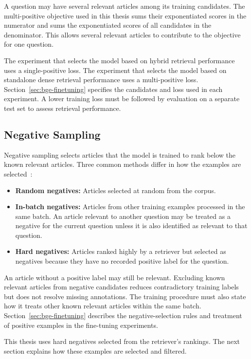 A question may have several relevant articles among its training candidates. The multi-positive objective used in this thesis sums their exponentiated scores in the numerator and sums the exponentiated scores of all candidates in the denominator. This allows several relevant articles to contribute to the objective for one question.

The experiment that selects the model based on hybrid retrieval performance uses a single-positive loss. The experiment that selects the model based on standalone dense retrieval performance uses a multi-positive loss. Section~\ref{sec:bge-finetuning} specifies the candidates and loss used in each experiment. A lower training loss must be followed by evaluation on a separate test set to assess retrieval performance.

\subsection{Negative Sampling}

Negative sampling selects articles that the model is trained to rank below the known relevant articles. Three common methods differ in how the examples are selected~\cite{karpukhin2020,zhan2021}:
\begin{itemize}
    \item \textbf{Random negatives:} Articles selected at random from the corpus.
    \item \textbf{In-batch negatives:} Articles from other training examples processed in the same batch. An article relevant to another question may be treated as a negative for the current question unless it is also identified as relevant to that question.
    \item \textbf{Hard negatives:} Articles ranked highly by a retriever but selected as negatives because they have no recorded positive label for the question.
\end{itemize}

An article without a positive label may still be relevant. Excluding known relevant articles from negative candidates reduces contradictory training labels but does not resolve missing annotations. The training procedure must also state how it treats other known relevant articles within the same batch. Section~\ref{sec:bge-finetuning} describes the negative-selection rules and treatment of positive examples in the fine-tuning experiments.

This thesis uses hard negatives selected from the retriever's rankings. The next section explains how these examples are selected and filtered.

